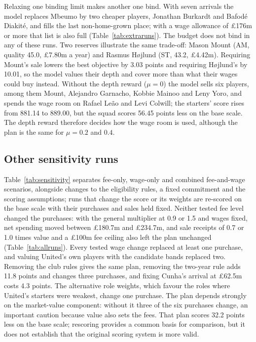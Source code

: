 Relaxing one binding limit makes another one bind. With seven arrivals the model replaces Mbeumo by two cheaper players, Jonathan Burkardt and Bafodé Diakité, and fills the last non-home-grown place; with a wage allowance of \pounds 176m or more that list is also full (Table~\ref{tab:extraruns}). The budget does not bind in any of these runs. Two reserves illustrate the same trade-off: Mason Mount (AM, quality 45.0, \pounds 7.80m a year) and Rasmus Højlund (ST, 43.2, \pounds 4.42m). Requiring Mount's sale lowers the best objective by 3.03 points and requiring Højlund's by 10.01, so the model values their depth and cover more than what their wages could buy instead. Without the depth reward ($\mu = 0$) the model sells six players, among them Mount, Alejandro Garnacho, Kobbie Mainoo and Leny Yoro, and spends the wage room on Rafael Leão and Levi Colwill; the starters' score rises from 881.14 to 889.00, but the squad scores 56.45 points less on the base scale. The depth reward therefore decides how the wage room is used, although the plan is the same for $\mu = 0.2$ and $0.4$.

\subsection{Other sensitivity runs}\label{sec:sensitivity}

Table~\ref{tab:sensitivity} separates fee-only, wage-only and combined fee-and-wage scenarios, alongside changes to the eligibility rules, a fixed commitment and the scoring assumptions; runs that change the score or its weights are re-scored on the base scale with their purchases and sales held fixed. Neither tested fee level changed the purchases: with the general multiplier at 0.9 or 1.5 and wages fixed, net spending moved between \pounds 180.7m and \pounds 234.7m, and sale receipts of 0.7 or 1.0 times value and a \pounds 100m fee ceiling also left the plan unchanged (Table~\ref{tab:allruns}). Every tested wage change replaced at least one purchase, and valuing United's own players with the candidate bands replaced two. Removing the club rules gives the same plan, removing the two-year rule adds 11.8 points and changes three purchases, and fixing Cunha's arrival at \pounds 62.5m costs 4.3 points. The alternative role weights, which favour the roles where United's starters were weakest, change one purchase. The plan depends strongly on the market-value component: without it three of the six purchases change, an important caution because value also sets the fees. That plan scores 32.2 points less on the base scale; rescoring provides a common basis for comparison, but it does not establish that the original scoring system is more valid.

